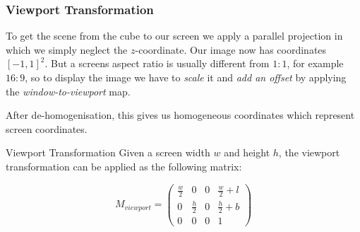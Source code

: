 \documentclass[english]{panikzettel}
\begin{document}
\begin{center}
\end{center}

\subsubsection*{Viewport Transformation}

\begin{halfboxl}
To get the scene from the cube to our screen we apply a parallel projection in which we simply neglect the $z$-coordinate. Our image now has coordinates $[-1, 1]^2$. But a screens aspect ratio is usually different from $1:1$, for example $16:9$, so to display the image we have to \emph{scale} it and \emph{add an offset} by applying the \emph{window-to-viewport} map.

After de-homogenisation, this gives us homogeneous coordinates which represent screen coordinates.
\end{halfboxl}%
\begin{halfboxr}
\vspace{-\baselineskip}
\begin{defi}{Viewport Transformation}
Given a screen width $w$ and height $h$, the viewport transformation can be applied as the following matrix:

$$M_{viewport} = \begin{pmatrix}
\frac{w}{2} & 0 & 0 & \frac{w}{2} + l \\
0 & \frac{h}{2} & 0 & \frac{h}{2} + b \\
0 & 0 & 0 & 1
\end{pmatrix}$$
\end{defi}
\end{halfboxr}
\end{document}
